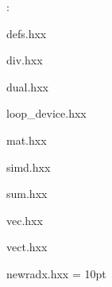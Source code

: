 \vspace{5mm}

: 

defs.hxx

div.hxx

dual.hxx

loop\_device.hxx

mat.hxx

simd.hxx

sum.hxx

vec.hxx

vect.hxx

newradx.hxx
\vspace{2mm}\parskip = 10pt 

